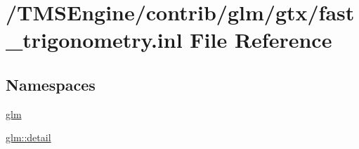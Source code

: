 \hypertarget{fast__trigonometry_8inl}{}\section{/\+T\+M\+S\+Engine/contrib/glm/gtx/fast\+\_\+trigonometry.inl File Reference}
\label{fast__trigonometry_8inl}
\subsection*{Namespaces}
\begin{DoxyCompactItemize}
\item 
 \hyperlink{namespaceglm}{glm}
\item 
 \hyperlink{namespaceglm_1_1detail}{glm\+::detail}
\end{DoxyCompactItemize}
